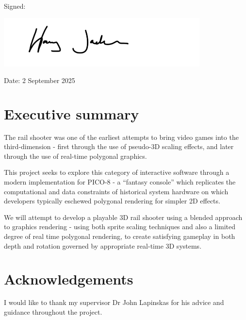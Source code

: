 \documentclass[11pt]{article}
\begin{document}
\vspace{0.5cm}

Signed:

\includegraphics[width=0.8\textwidth]{signature}

Date: 2 September 2025

\newpage

\section*{Executive summary}

\vspace{0.5cm}

The rail shooter was one of the earliest attempts to bring video
games into the third-dimension - first through the use of pseudo-3D
scaling effects, and later through the use of real-time polygonal graphics.

This project seeks to explore this category of interactive software through a
modern implementation for PICO-8 - a ``fantasy console'' which replicates the
computational and data constraints of historical system hardware on which
developers typically eschewed polygonal rendering for simpler 2D effects.

We will attempt to develop a playable 3D rail shooter using a
blended approach to graphics rendering - using both sprite scaling techniques and
also a limited degree of real time polygonal rendering, to create satisfying
gameplay in both depth and rotation governed by appropriate real-time 3D systems.

\vspace{1.5cm}

\section*{Acknowledgements}

\vspace{0.5cm}

I would like to thank my supervisor Dr John Lapinskas for his advice and guidance
throughout the project.

\newpage

\tableofcontents

\newpage
\end{document}
